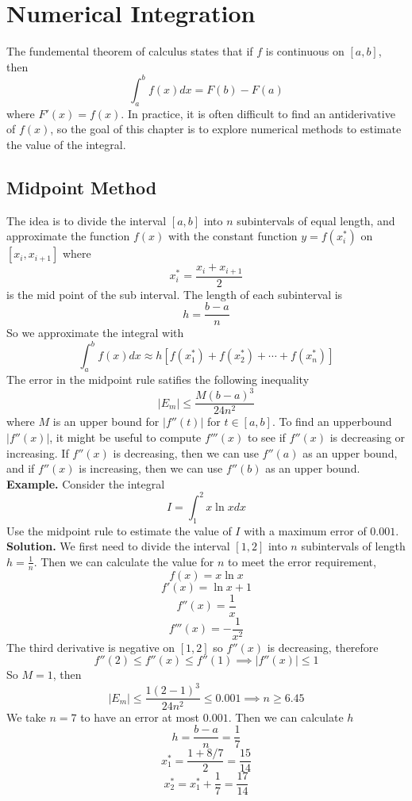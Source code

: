 \documentclass[openany]{report}
\begin{document}
\chapter{Numerical Integration}

The fundemental theorem of calculus states that if $f$ is continuous on $[a,b]$, then
\[\int_{a}^{b} f(x)dx = F(b) - F(a)\]
where $F'(x) = f(x)$. In practice, it is often difficult to find an antiderivative of $f(x)$, so the goal of this chapter is to explore numerical methods to estimate the value of the integral.

\section{Midpoint Method}
The idea is to divide the interval $[a,b]$ into $n$ subintervals of equal length, and approximate the function $f(x)$ with the constant function $y = f(x_i^*)$ on $[x_i, x_{i+1}]$ where 
\[x_i^* = \frac{x_i + x_{i+1}}{2}\]
is the mid point of the sub interval. The length of each subinterval is
\[h = \frac{b-a}{n}\]
So we approximate the integral with 
\[\int_a^b f(x)dx \approx h[f(x_1^*) + f(x_2^*) + \cdots + f(x_n^*)]\]
The error in the midpoint rule satifies the following inequality 
\[|E_m| \leq \frac{M(b-a)^3}{24n^2}\]
where $M$ is an upper bound for $|f''(t)|$ for $t \in [a,b]$. To find an upperbound $|f''(x)|$, it might be useful to compute $f'''(x)$ to see if $f''(x)$ is decreasing or increasing. If $f''(x)$ is decreasing, then we can use $f''(a)$ as an upper bound, and if $f''(x)$ is increasing, then we can use $f''(b)$ as an upper bound.\\[2ex]
\textbf{Example.} Consider the integral 
\[I = \int_1^2 x \ln x dx\]
Use the midpoint rule to estimate the value of $I$ with a maximum error of $0.001$. \\[2ex]
\textbf{Solution.} We first need to divide the interval $[1,2]$ into $n$ subintervals of length $h = \frac{1}{n}$. Then we can calculate the value for $n$ to meet the error requirement,
\[f(x) = x \ln x\]
\[f'(x) = \ln x + 1\]
\[f''(x) = \frac{1}{x}\]
\[f'''(x) = -\frac{1}{x^2}\]
The third derivative is negative on $[1,2]$ so $f''(x)$ is decreasing, therefore 
\[f''(2) \leq f''(x) \leq f''(1) \implies |f''(x)| \leq 1\]
So $M = 1$, then 
\[|E_m| \leq \frac{1 (2-1)^3}{24n^2} \leq 0.001 \implies n \geq 6.45\]
We take $n = 7$ to have an error at most $0.001$. Then we can calculate $h$ 
\[h = \frac{b-a}{n} = \frac{1}{7}\]
\[x_1^* = \frac{1 + 8/7}{2} = \frac{15}{14}\]
\[x_2^* = x_1^* + \frac{1}{7} = \frac{17}{14}\]
\end{document}
